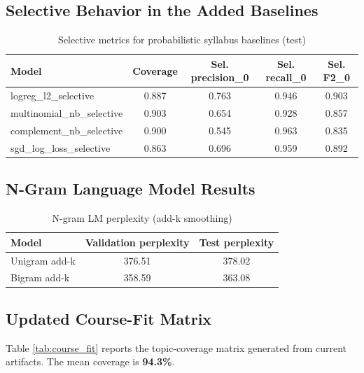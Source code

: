 \documentclass[12pt,a4paper]{article}
\begin{document}
\subsection{Selective Behavior in the Added Baselines}
\begin{table}[H]
\centering
\caption{Selective metrics for probabilistic syllabus baselines (test)}
\label{tab:syllabus_selective}
\begin{tabular}{lcccc}
\toprule
Model & Coverage & Sel. precision\_0 & Sel. recall\_0 & Sel. F2\_0 \\
\midrule
logreg\_l2\_selective & 0.887 & 0.763 & 0.946 & 0.903 \\
multinomial\_nb\_selective & 0.903 & 0.654 & 0.928 & 0.857 \\
complement\_nb\_selective & 0.900 & 0.545 & 0.963 & 0.835 \\
sgd\_log\_loss\_selective & 0.863 & 0.696 & 0.959 & 0.892 \\
\bottomrule
\end{tabular}
\end{table}

\subsection{N-Gram Language Model Results}
\begin{table}[H]
\centering
\caption{N-gram LM perplexity (add-k smoothing)}
\label{tab:ngram_ppl}
\begin{tabular}{lcc}
\toprule
Model & Validation perplexity & Test perplexity \\
\midrule
Unigram add-k & 376.51 & 378.02 \\
Bigram add-k & 358.59 & 363.08 \\
\bottomrule
\end{tabular}
\end{table}

\subsection{Updated Course-Fit Matrix}
Table \ref{tab:course_fit} reports the topic-coverage matrix generated from current artifacts. The mean coverage is \textbf{94.3\%}.
\end{document}
